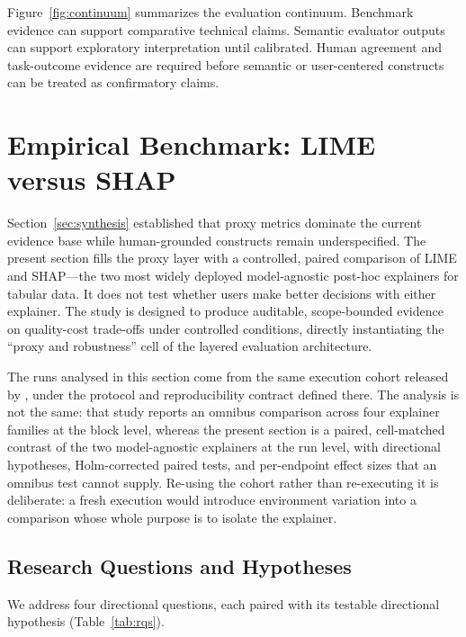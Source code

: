 \documentclass[10pt]{article}
\begin{document}
Figure~\ref{fig:continuum} summarizes the evaluation continuum. Benchmark
evidence can support comparative technical claims. Semantic evaluator
outputs can support exploratory interpretation until calibrated. Human
agreement and task-outcome evidence are required before semantic or
user-centered constructs can be treated as confirmatory claims.

\section{Empirical Benchmark: LIME versus SHAP}
\label{sec:empirical}

Section~\ref{sec:synthesis} established that proxy metrics dominate the
current evidence base while human-grounded constructs remain underspecified.
The present section fills the proxy layer with a controlled, paired
comparison of LIME and SHAP---the two most widely deployed
model-agnostic post-hoc explainers for tabular data. It does not test
whether users make better decisions with either explainer. The study is
designed to produce auditable, scope-bounded evidence on quality-cost
trade-offs under controlled conditions, directly instantiating the
``proxy and robustness'' cell of the layered evaluation architecture.

The runs analysed in this section come from the same execution cohort
released by \citet{herrera2026framework}, under the protocol and
reproducibility contract defined there. The analysis is not the same: that
study reports an omnibus comparison across four explainer families at the
block level, whereas the present section is a paired, cell-matched contrast
of the two model-agnostic explainers at the run level, with directional
hypotheses, Holm-corrected paired tests, and per-endpoint effect sizes that
an omnibus test cannot supply. Re-using the cohort rather than re-executing
it is deliberate: a fresh execution would introduce environment variation
into a comparison whose whole purpose is to isolate the explainer.

\subsection{Research Questions and Hypotheses}
\label{sec:rqs}

We address four directional questions, each paired with its testable
directional hypothesis (Table~\ref{tab:rqs}).
\end{document}
